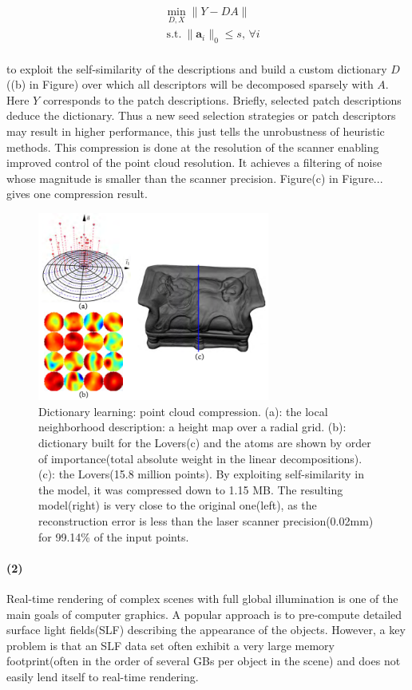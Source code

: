 \small{
\begin{equation}
\label{eq:dictcompression}
\begin{split}
&\min_{D,X}  \|Y-DA\| \\
&~\mathrm{s.t.}~ \|\mathbf{a}_i\|_0 \leq s,\,\forall i
\end{split}
\end{equation}
}
\\
to exploit the self-similarity of the descriptions and build a custom dictionary $D$((b) in Figure) over which all descriptors will be decomposed sparsely with $A$.
Here $Y$ corresponds to the patch descriptions.
Briefly, selected patch descriptions deduce the dictionary.
Thus a new seed selection strategies or patch descriptors may result in higher performance,
this just tells the unrobustness of heuristic methods.
This compression is done at the resolution of the scanner enabling improved control of the point cloud resolution.
It achieves a filtering of noise whose magnitude is smaller than the scanner precision.
Figure(c) in Figure... gives one compression result.

\begin{figure}[ht]
  \centering
  \includegraphics[width=3.0in]{images/compression_learning}
  \caption{Dictionary learning: point cloud compression\cite{digne2014self}. (a): the local neighborhood description: a height map over a radial grid. (b): dictionary built for the Lovers(c) and the atoms are shown by order of importance(total absolute weight in the linear decompositions). (c): the Lovers(15.8 million points). By exploiting self-similarity in the model, it was compressed down to 1.15 MB. The resulting model(right) is very close to the original one(left), as the reconstruction error is less than the laser scanner precision(0.02mm) for 99.14\% of the input points.}
\end{figure}


\paragraph{(2)}
Real-time rendering of complex scenes with full global illumination is one of the main goals of computer graphics.
A popular approach is to pre-compute detailed surface light fields(SLF) describing the appearance of the objects.
However, a key problem is that an SLF data set often exhibit a very large memory footprint(often in the order of several GBs per object in the scene) and does not easily lend itself to real-time rendering.

